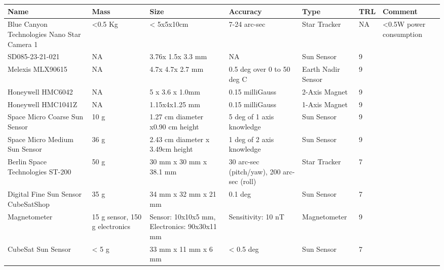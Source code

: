 \begin{center}
     \begin{tabular}{ | p{2cm} | p{1.25cm} | p{2cm} | l | l | l | p{2cm} |}
     \hline

      {\bf Name} & {\bf Mass} & {\bf Size} & {\bf Accuracy} & {\bf Type} & {\bf TRL} & {\bf Comment}  \\ \hline

     Blue Canyon Technologies Nano Star Camera 1 \cite{BCT} & <0.5 Kg& < 5x5x10cm& 7-24 arc-sec & Star Tracker & NA & <0.5W power consumption \\ \hline

     SD085-23-21-021 \cite{aes2} & NA & 3.76x 1.5x 3.3 mm & NA & Sun Sensor & 9 & \\ \hline

     Melexis MLX90615 \cite{aes3} & NA & 4.7x 4.7x 2.7 mm& 0.5 deg over 0 to 50 deg C & Earth Nadir Sensor & 9 &  \\
     \hline

     Honeywell HMC6042 \cite{aes4} & NA & 5 x 3.6 x 1.0mm & 0.15 milliGauss & 2-Axis Magnet & 9 &   \\ \hline

     Honeywell HMC1041Z \cite{aes5} & NA &1.15x4x1.25 mm & 0.15 milliGauss & 1-Axis Magnet & 9 &   \\ \hline
     
     Space Micro Coarse Sun Sensor \cite{SMI} &  10 g & 1.27 cm diameter x0.90 cm height & 5 deg of 1 axis knowledge & Sun Sensor & 9 & \\ \hline
     
     Space Micro Medium Sun Sensor \cite{SMI} & 36 g &	2.43 cm diameter x 3.49cm height & 1 deg of 2 axis knowledge & Sun Sensor & 9 & \\ \hline
     
	Berlin Space Technologies ST-200 \cite{BST} & 50 g & 30 mm x 30 mm x 38.1 mm & 30 arc-sec (pitch/yaw), 200 arc-sec (roll) & Star Tracker & 7 & \\ \hline

	Digital Fine Sun Sensor CubeSatShop \cite{CubeShop} & 35 g & 34 mm x 32 mm x 21 mm & 0.1 deg & Sun Sensor & 7 & \\ \hline
	
	Magnetometer \cite{CubeShop} & 15 g sensor, 150 g electronics & Sensor: 10x10x5 mm, Electronics: 90x30x11 mm & Sensitivity: 10 nT & Magnetometer & 9 & \\ \hline
	
	CubeSat Sun Sensor \cite{CubeShop} & < 5 g & 33 mm x 11 mm x 6 mm & < 0.5 deg & Sun Sensor & 7 & \\ \hline

     \end{tabular}
\end{center}

